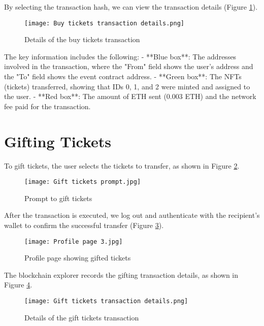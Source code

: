 By selecting the transaction hash, we can view the transaction details (Figure
\ref{fig:buy_tickets_transaction_details}).

\begin{figure}[H]
    \texttt{[image: Buy tickets transaction details.png]}
    \centering
    \caption{Details of the buy tickets transaction}
    \label{fig:buy_tickets_transaction_details}
\end{figure}

The key information includes the following: - **Blue box**: The addresses
involved in the transaction, where the "From" field shows the user's address
and the "To" field shows the event contract address. - **Green box**: The NFTs
(tickets) transferred, showing that IDs 0, 1, and 2 were minted and assigned to
the user. - **Red box**: The amount of ETH sent (0.003 ETH) and the network fee
paid for the transaction.

\section{Gifting Tickets}
\label{sec:gift_tickets}

To gift tickets, the user selects the tickets to transfer, as shown in Figure
\ref{fig:gift_tickets_prompt}.

\begin{figure}[H]
    \texttt{[image: Gift tickets prompt.jpg]}
    \centering
    \caption{Prompt to gift tickets}
    \label{fig:gift_tickets_prompt}
\end{figure}

After the transaction is executed, we log out and authenticate with the
recipient's wallet to confirm the successful transfer (Figure
\ref{fig:profile_page_3}).

\begin{figure}[H]
    \texttt{[image: Profile page 3.jpg]}
    \centering
    \caption{Profile page showing gifted tickets}
    \label{fig:profile_page_3}
\end{figure}

The blockchain explorer records the gifting transaction details, as shown in
Figure \ref{fig:gift_tickets_transaction_details}.

\begin{figure}[H]
    \texttt{[image: Gift tickets transaction details.png]}
    \centering
    \caption{Details of the gift tickets transaction}
    \label{fig:gift_tickets_transaction_details}
\end{figure}


